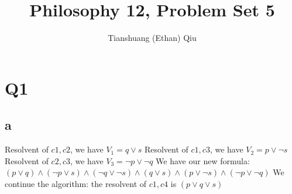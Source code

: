 \documentclass[12pt]{article}
\author{Tianshuang (Ethan) Qiu}
\begin{document}
\title{Philosophy 12, Problem Set 5}
\maketitle

\section{Q1}

\subsection{a}
Resolvent of $c1, c2$, we have $V_1 = q \lor s$
\newline
Resolvent of $c1, c3$, we have $V_2 = p \lor \neg s$
\newline
Resolvent of $c2, c3$, we have $V_3 = \neg p \lor \neg q$
\newline
We have our new formula: $(p \lor q) \land (\neg p \lor s) \land (\neg q \lor \neg s) 
\land (q \lor s) \land (p \lor \neg s) \land (\neg p \lor \neg q)$
\newline
We continue the algorithm: the resolvent of $c1, c4$ is $(p \lor q \lor s)$
\end{document}
